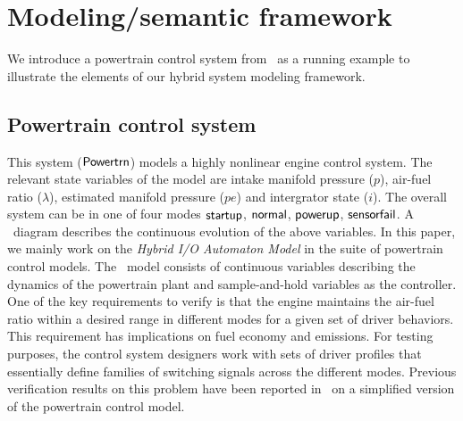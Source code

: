 \section{Modeling/semantic framework}
\label{sec:prelims}

We introduce a powertrain control system from~\cite{jin2014powertrain}
as a running example to illustrate the elements of our hybrid system
modeling framework.

\subsection{Powertrain  control system}
\label{ex:powertrain}

This system (${\operatorname{\mathsf{Powertrn}}}$) models a highly nonlinear engine control system. The relevant state variables of the model are intake manifold pressure ($p$), air-fuel ratio ($\lambda$), estimated manifold pressure ($pe$) and intergrator state ($i$).
The overall system can be in one of four modes
$\Lmode{startup}$,
$\Lmode{normal}$,
$\Lmode{powerup}$, 
$\Lmode{sensorfail}$. 
A \Simulink\ diagram describes the continuous evolution of the above variables. 
In this paper, we mainly work on the {\em Hybrid I/O Automaton Model}
in the suite of powertrain control models. The \Simulink\ model
consists of continuous variables describing the dynamics of the
powertrain plant and sample-and-hold variables as the controller.  One
of the key requirements to verify is that the engine maintains the
air-fuel ratio within a desired range in different modes for a given
set of driver behaviors. This requirement has implications on fuel
economy and emissions.
%
For testing purposes, the control system designers work with sets of driver profiles that essentially define families of switching signals across the different modes. 
Previous verification results on this problem have been reported in~\cite{DFMV:CAV2015, FDMV:ARCH2015} on a simplified version of the powertrain control model.

\vspace{-10pt}
